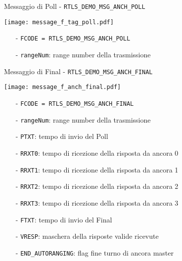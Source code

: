 \begin{frame}{Messaggio di Poll - \lstinline!RTLS_DEMO_MSG_ANCH_POLL!}
  \begin{center}
    \texttt{[image: message\_f\_tag\_poll.pdf]}
  \end{center}
  \begin{itemize}
  \item[-] \lstinline!FCODE = RTLS_DEMO_MSG_ANCH_POLL!
  \item[-] \lstinline!rangeNum!: range number della trasmissione
  \end{itemize}
\end{frame}

\begin{frame}{Messaggio di Final - \lstinline!RTLS_DEMO_MSG_ANCH_FINAL!}
  \begin{center}
    \texttt{[image: message\_f\_anch\_final.pdf]}
  \end{center}
  \begin{itemize}
  \item[-] \lstinline!FCODE = RTLS_DEMO_MSG_ANCH_FINAL!
  \item[-] \lstinline!rangeNum!: range number della trasmissione
  \item[-] \lstinline!PTXT!: tempo di invio del Poll
  \item[-] \lstinline!RRXT0!: tempo di ricezione della risposta da ancora 0
  \item[-] \lstinline!RRXT1!: tempo di ricezione della risposta da ancora 1
  \item[-] \lstinline!RRXT2!: tempo di ricezione della risposta da ancora 2
  \item[-] \lstinline!RRXT3!: tempo di ricezione della risposta da ancora 3
  \item[-] \lstinline!FTXT!: tempo di invio del Final
  \item[-] \lstinline!VRESP!: maschera della risposte valide ricevute
  \item[-] \lstinline!END_AUTORANGING!: flag fine turno di ancora master
  \end{itemize}
\end{frame}

